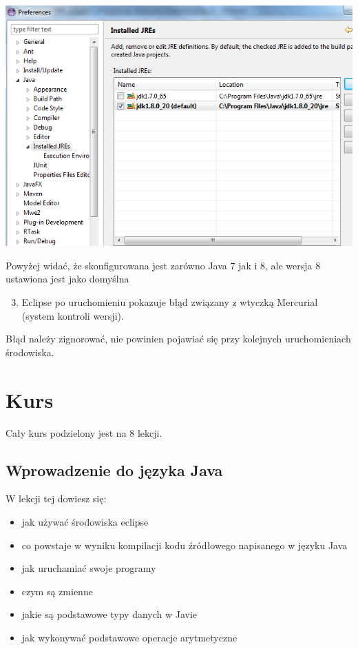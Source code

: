 \documentclass[letterpaper,10pt,english]{sphinxmanual}
\begin{document}
\includegraphics{eclipsejdk.png}

Powyżej widać, że skonfigurowana jest zarówno Java 7 jak i 8, ale wersja 8 ustawiona jest jako domyślna
\begin{enumerate}
\setcounter{enumi}{2}
\item {} 
Eclipse po uruchomieniu pokazuje błąd związany z wtyczką Mercurial (system kontroli wersji).

\end{enumerate}

Błąd należy zignorować, nie powinien pojawiać się przy kolejnych uruchomieniach środowiska.


\chapter{Kurs}
\label{index:ze-strony-oracle}\label{index:kurs}
Cały kurs podzielony jest na 8 lekcji.


\section{Wprowadzenie do języka Java}
\label{wprowadzenie:wprowadzenie-do-jezyka-java}\label{wprowadzenie::doc}
W lekcji tej dowiesz się:
\begin{itemize}
\item {} 
jak używać środowiska eclipse

\item {} 
co powstaje w wyniku kompilacji kodu źródłowego napisanego w języku Java

\item {} 
jak uruchamiać swoje programy

\item {} 
czym są zmienne

\item {} 
jakie są podstawowe typy danych w Javie

\item {} 
jak wykonywać podstawowe operacje arytmetyczne

\end{itemize}
\end{document}
